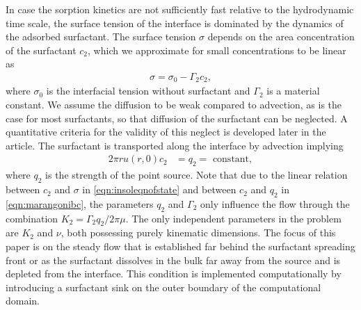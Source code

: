 \documentclass[]{jfm}
\begin{document}
In case the sorption kinetics are not sufficiently fast relative to the hydrodynamic time scale, the surface tension of the interface is dominated by the dynamics of the adsorbed surfactant.
The surface tension $\sigma$ depends on the area concentration of the surfactant $c_2$, which we approximate for small concentrations to be linear as
\begin{align}
 \sigma = \sigma_0 - \Gamma_2 c_2,
 \label{eqn:insoleqnofstate}
\end{align}
where $\sigma_0$ is the interfacial tension without surfactant and $\Gamma_2$ is a material constant.
We assume the diffusion to be weak compared to advection, as is the case for most surfactants, so that diffusion of the surfactant can be neglected.
A quantitative criteria for the validity of this neglect is developed later in the article.
The surfactant is transported along the interface by advection implying
\begin{align}
 2\pi ru(r,0) c_2 &= q_2 = \text{ constant},
\label{eqn:marangonibc}
\end{align}
where $q_2$ is the strength of the point source.
Note that due to the linear relation between $c_2$ and $\sigma$ in \eqref{eqn:insoleqnofstate} and between $c_2$ and $q_2$ in \eqref{eqn:marangonibc}, the parameters $q_2$ and $\Gamma_2$ only influence the flow through the combination $K_2=\Gamma_2 q_2/2 \pi \mu$.
The only independent parameters in the problem are $K_2$ and $\nu$, both possessing purely kinematic dimensions.
The focus of this paper is on the steady flow that is established far behind the surfactant spreading front or as the surfactant dissolves in the bulk far away from the source and is depleted from the interface.
This condition is implemented computationally by introducing a surfactant sink on the outer boundary of the computational domain.
\end{document}
